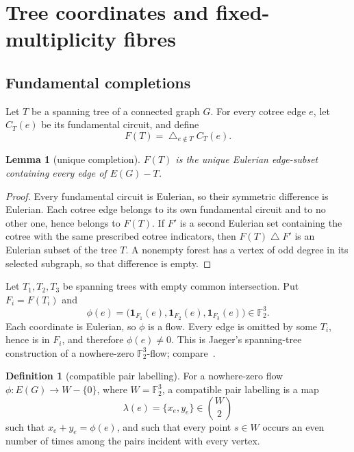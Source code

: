 \documentclass[11pt]{article}
\newtheorem{lemma}[theorem]{Lemma}
\theoremstyle{definition}
\newtheorem{definition}[theorem]{Definition}
\theoremstyle{remark}
\newcommand{\F}{\mathbb F}
\newcommand{\symdiff}{\mathbin{\triangle}}
\newcommand{\1}{\mathbf 1}
\begin{document}
\section{Tree coordinates and fixed-multiplicity fibres}

\subsection{Fundamental completions}

Let \(T\) be a spanning tree of a connected graph \(G\).  For every
cotree edge \(e\), let \(C_T(e)\) be its fundamental circuit, and define
\[
 F(T)=\mathop{\symdiff}_{e\notin T} C_T(e).              \tag{3.1}
\]

\begin{lemma}[unique completion]\label{lem:completion}
\(F(T)\) is the unique Eulerian edge-subset containing every edge of
\(E(G)-T\).
\end{lemma}

\begin{proof}
Every fundamental circuit is Eulerian, so their symmetric difference is
Eulerian.  Each cotree edge belongs to its own fundamental circuit and to no
other one, hence belongs to \(F(T)\).  If \(F'\) is a second Eulerian set
containing the cotree with the same prescribed cotree indicators, then
\(F(T)\symdiff F'\) is an Eulerian subset of the tree \(T\).  A nonempty
forest has a vertex of odd degree in its selected subgraph, so that
difference is empty.
\end{proof}

Let \(T_1,T_2,T_3\) be spanning trees with empty common intersection.
Put \(F_i=F(T_i)\) and
\[
 \phi(e)=\bigl(\1_{F_1}(e),\1_{F_2}(e),\1_{F_3}(e)\bigr)
       \in\F_2^3.                                      \tag{3.2}
\]
Each coordinate is Eulerian, so \(\phi\) is a flow.  Every edge is omitted
by some \(T_i\), hence is in \(F_i\), and therefore \(\phi(e)\ne0\).
This is Jaeger's spanning-tree construction of a nowhere-zero
\(\F_2^3\)-flow; compare~\cite{Jaeger1979,Oum2026}.

\begin{definition}[compatible pair labelling]
For a nowhere-zero flow \(\phi:E(G)\to W-\{0\}\), where
\(W=\F_2^3\), a compatible pair labelling is a map
\[
 \lambda(e)=\{x_e,y_e\}\in\binom W2
\]
such that \(x_e+y_e=\phi(e)\), and such that every point \(s\in W\)
occurs an even number of times among the pairs incident with every vertex.
\end{definition}
\end{document}

